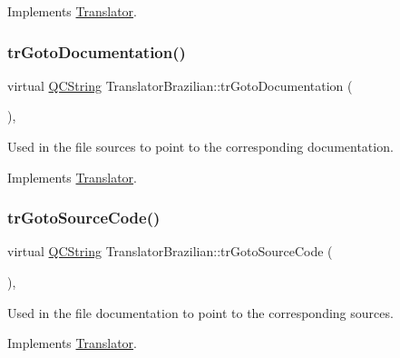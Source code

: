 Implements \mbox{\hyperlink{class_translator}{Translator}}.

\mbox{\label{class_translator_brazilian_a504efea2dee3fca13a53881c112686c2}} 
\subsubsection{\texorpdfstring{trGotoDocumentation()}{trGotoDocumentation()}}
{\footnotesize\ttfamily virtual \mbox{\hyperlink{class_q_c_string}{Q\+C\+String}} Translator\+Brazilian\+::tr\+Goto\+Documentation (\begin{DoxyParamCaption}{ }\end{DoxyParamCaption})\hspace{0.3cm}{\ttfamily [inline]}, {\ttfamily [virtual]}}

Used in the file sources to point to the corresponding documentation. 

Implements \mbox{\hyperlink{class_translator}{Translator}}.

\mbox{\label{class_translator_brazilian_afdc810dfc452029722c7b3307a9e683f}} 
\subsubsection{\texorpdfstring{trGotoSourceCode()}{trGotoSourceCode()}}
{\footnotesize\ttfamily virtual \mbox{\hyperlink{class_q_c_string}{Q\+C\+String}} Translator\+Brazilian\+::tr\+Goto\+Source\+Code (\begin{DoxyParamCaption}{ }\end{DoxyParamCaption})\hspace{0.3cm}{\ttfamily [inline]}, {\ttfamily [virtual]}}

Used in the file documentation to point to the corresponding sources. 

Implements \mbox{\hyperlink{class_translator}{Translator}}.

\mbox{\label{class_translator_brazilian_ac418d2db7eb56a989869697cd4c92854}} 
